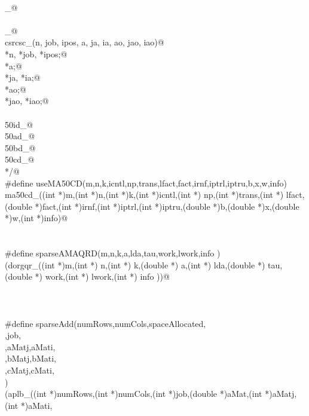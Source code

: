 \documentclass[12pt]{article}
\begin{document}
\begin{flushleft}
\begin{minipage}{\linewidth}
\begin{list}{}{}
\mbox{}\verb@@\\
\mbox{}\verb@dgeesx_@\\
\mbox{}\verb@@\\
\mbox{}\verb@csrcsc_@\\
\mbox{}\verb@int csrcsc_(n, job, ipos, a, ja, ia, ao, jao, iao)@\\
\mbox{}\verb@integer *n, *job, *ipos;@\\
\mbox{}\verb@doublereal *a;@\\
\mbox{}\verb@integer *ja, *ia;@\\
\mbox{}\verb@doublereal *ao;@\\
\mbox{}\verb@integer *jao, *iao;@\\
\mbox{}\verb@@\\
\mbox{}\verb@ma50id_@\\
\mbox{}\verb@ma50ad_@\\
\mbox{}\verb@ma50bd_@\\
\mbox{}\verb@ma50cd_@\\
\mbox{}\verb@*/@\\
\mbox{}\verb@#define useMA50CD(m,n,k,icntl,np,trans,lfact,fact,irnf,iptrl,iptru,b,x,w,info)\@\\
\mbox{}\verb@void ma50cd_((int *)m,(int *)n,(int *)k,(int *)icntl,(int *) np,(int *)trans,(int *) lfact,(double *)fact,(int *)irnf,(int *)iptrl,(int *)iptru,(double *)b,(double *)x,(double *)w,(int *)info)@\\
\mbox{}\verb@@\\
\mbox{}\verb@@\\
\mbox{}\verb@#define sparseAMAQRD(m,n,k,a,lda,tau,work,lwork,info )\@\\
\mbox{}\verb@(dorgqr_((int *)m,(int *) n,(int *) k,(double *) a,(int *) lda,(double *) tau,(double *) work,(int *) lwork,(int *) info ))@\\
\mbox{}\verb@@\\
\mbox{}\verb@@\\
\mbox{}\verb@@\\
\mbox{}\verb@#define sparseAdd(numRows,numCols,spaceAllocated, \@\\
\mbox{}\verb@workSpace,job, \@\\
\mbox{}\verb@aMat,aMatj,aMati, \@\\
\mbox{}\verb@bMat,bMatj,bMati, \@\\
\mbox{}\verb@cMat,cMatj,cMati, \@\\
\mbox{}\verb@errCode) \@\\
\mbox{}\verb@(aplb_((int *)numRows,(int *)numCols,(int *)job,(double  *)aMat,(int *)aMatj,(int *)aMati, \@\\

\end{list}
\end{minipage}
\end{flushleft}
\end{document}
